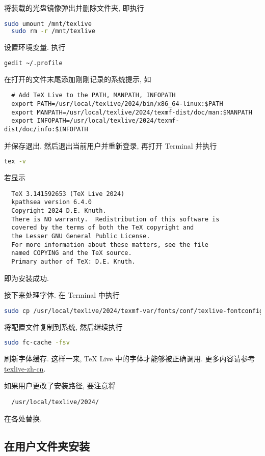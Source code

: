 将装载的光盘镜像弹出并删除文件夹,
即执行
\begin{lstlisting}[language = bash]
  sudo umount /mnt/texlive
  sudo rm -r /mnt/texlive
\end{lstlisting}

设置环境变量.
执行
\begin{lstlisting}[language = bash]
  gedit ~/.profile
\end{lstlisting}
在打开的文件末尾添加刚刚记录的系统提示,
如
\begin{lstlisting}
  # Add TeX Live to the PATH, MANPATH, INFOPATH
  export PATH=/usr/local/texlive/2024/bin/x86_64-linux:$PATH
  export MANPATH=/usr/local/texlive/2024/texmf-dist/doc/man:$MANPATH
  export INFOPATH=/usr/local/texlive/2024/texmf-dist/doc/info:$INFOPATH
\end{lstlisting}
并保存退出.
然后退出当前用户并重新登录,
再打开 \textsf{Terminal} 并执行
\begin{lstlisting}[language=bash]
  tex -v
\end{lstlisting}
若显示
\begin{lstlisting}
  TeX 3.141592653 (TeX Live 2024)
  kpathsea version 6.4.0
  Copyright 2024 D.E. Knuth.
  There is NO warranty.  Redistribution of this software is
  covered by the terms of both the TeX copyright and
  the Lesser GNU General Public License.
  For more information about these matters, see the file
  named COPYING and the TeX source.
  Primary author of TeX: D.E. Knuth.
\end{lstlisting}
即为安装成功.

接下来处理字体.
在 \textsf{Terminal} 中执行
\begin{lstlisting}[language=bash]
  sudo cp /usr/local/texlive/2024/texmf-var/fonts/conf/texlive-fontconfig.conf /etc/fonts/conf.d/09-texlive.conf
\end{lstlisting}
将配置文件复制到系统,
然后继续执行
\begin{lstlisting}[language=bash]
  sudo fc-cache -fsv
\end{lstlisting}
刷新字体缓存.
这样一来, \TeX{} Live 中的字体才能够被正确调用.
更多内容请参考 \href{https://tug.org/texlive/doc/texlive-zh-cn/texlive-zh-cn.pdf}{texlive-zh-cn}.

如果用户更改了安装路径,
要注意将
\begin{lstlisting}
  /usr/local/texlive/2024/
\end{lstlisting}
在各处替换.

\subsection{在用户文件夹安装}\label{subsec:ubuntu-user-folder}

